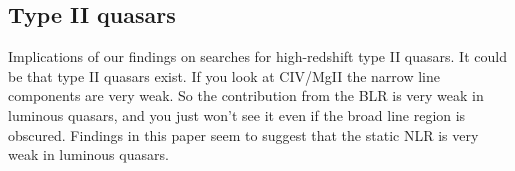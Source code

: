 \subsection{Type II quasars}

Implications of our findings on searches for high-redshift type II quasars. 
It could be that type II quasars exist. 
If you look at CIV/MgII the narrow line components are very weak. 
So the contribution from the \ac{BLR} is very weak in luminous quasars, and you just won't see it even if the broad line region is obscured.
Findings in this paper seem to suggest that the static \ac{NLR} is very weak in luminous quasars. 




